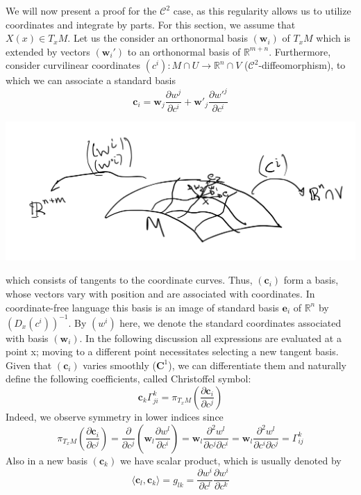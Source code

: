 \vspace{2ex}
We will now present a proof for the $\mathcal C^2$ case, as this regularity allows
us to utilize coordinates and integrate by parts. For this section, we assume that $X(x)\in
T_xM$. Let us the consider an orthonormal basis $(\mathbf w_i)$ of $T_xM$
which is extended by vectors $(\mathbf w_i')$ to an orthonormal basis of
$\mathbb R^{m+n}$. Furthermore, consider curvilinear coordinates $(c^i):M\cap
U\rightarrow \mathbb{R}^n\cap V$ ($\mathcal C^2$-diffeomorphism), to which we can
associate a standard basis 
\[\mathbf{c}_i=\mathbf{w}_j\frac{\partial w^j}{\partial c^i}+\mathbf{w'}_j\frac{\partial w'^j}{\partial c^i}\]
\begin{center}
\includegraphics[scale=0.2]{maps.png}
\end{center}
which consists of tangents to the coordinate curves. Thus, $(\mathbf c_i)$ form a
basis, whose vectors vary with position and are associated with coordinates. In coordinate-free
language this basis is an image of standard basis $\mathbf e_i$ of $\mathbb R^n$
by $(D_x(c^i))^{-1}$. By $(w^i)$
here, we denote the standard coordinates associated with basis $(\mathbf w_i)$. In the
following discussion all expressions are evaluated at a point x; moving to a
different point necessitates selecting a new tangent basis. Given that $(\mathbf c_i)$
varies smoothly ($\mathbf C^1$), we can differentiate them and
naturally define the following coefficients, called Christoffel symbol:
\[\mathbf c_k\Gamma_{ji}^k=\pi_{T_x M}(\frac{\partial\mathbf{c}_i}{\partial c^j})\]
Indeed, we observe symmetry in lower indices since
\[\pi_{T_xM}(\frac{\partial\mathbf{c}_i}{\partial c^j}) = \frac{\partial}{\partial c^j}(\mathbf{w}_l\frac{\partial w^l}{\partial c^i})
=\mathbf{w}_l\frac{\partial^2 w^l}{\partial c^j\partial c^i}=\mathbf{w}_l\frac{\partial^2 w^l}{\partial c^i\partial c^j}
=\Gamma_{ij}^k\]
Also in a new basis $(\mathbf{c}_k)$ we have scalar product, which is usually denoted by
\[\langle\mathbf{c}_l,\mathbf{c}_k\rangle=g_{lk}=\frac{\partial w^i}{\partial c^l}\frac{\partial w^i}{\partial c^k}\]
